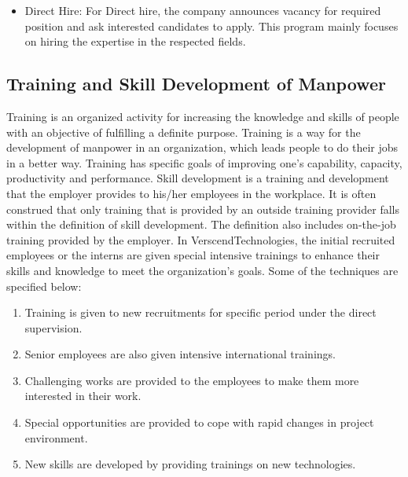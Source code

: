 \begin{itemize}
\begin{itemize}
\item Direct Hire: For Direct hire, the company announces vacancy for required position and ask interested
candidates to apply. This program mainly focuses on hiring the expertise in the respected fields.
\end{itemize}
\subsection{Training and Skill Development of Manpower}
Training is an organized activity for increasing the knowledge and skills of people with an objective of
fulfilling a definite purpose. Training is a way for the development of manpower in an organization, which
leads people to do their jobs in a better way. Training has specific goals of improving one's capability,
capacity, productivity and performance.
Skill development is a training and development that the employer provides to his/her employees in the
workplace. It is often construed that only training that is provided by an outside training provider falls within
the definition of skill development. The definition also includes on-the-job training provided by the employer.
In VerscendTechnologies, the initial recruited employees or the interns are given special intensive
trainings to enhance their skills and knowledge to meet the organization’s goals.
Some of the techniques are specified below:
\begin{enumerate}
\item Training is given to new recruitments for specific period under the direct supervision.
\item Senior employees are also given intensive international trainings.
\item Challenging works are provided to the employees to make them more interested in their work.
\item Special opportunities are provided to cope with rapid changes in project environment.
\item New skills are developed by providing trainings on new technologies.
\end{enumerate}

\end{itemize}
